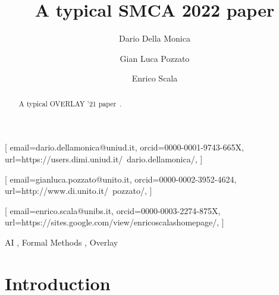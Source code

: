 \documentclass{ceurart}
\begin{document}


\title{A typical SMCA 2022 paper}

\author[1]{Dario {Della Monica}}[%
email=dario.dellamonica@uniud.it,
orcid=0000-0001-9743-665X,                           %
url=https://users.dimi.uniud.it/~dario.dellamonica/, %
]
\address[1]{University of Udine, Italy}

\author[2]{Gian Luca Pozzato}[%
email=gianluca.pozzato@unito.it,
orcid=0000-0002-3952-4624,             %
url=http://www.di.unito.it/~pozzato/,  %
]
\address[2]{Università degli Studi di Torino}

\author[3]{Enrico Scala}[%
email=enrico.scala@unibs.it,
orcid=0000-0003-2274-875X,                               %
url=https://sites.google.com/view/enricoscalashomepage/, %
]
\address[3]{Università degli Studi di Brescia}

\begin{abstract}
  A typical OVERLAY '21 paper~\cite{Example21}.
\end{abstract}

\begin{keywords}
  AI \sep
  Formal Methods \sep
  Overlay
\end{keywords}


\maketitle

\section{Introduction}

\lipsum[1-10] \cite{Example21}

\begin{acknowledgments}
  \lipsum[1]
\end{acknowledgments}




\end{document}
